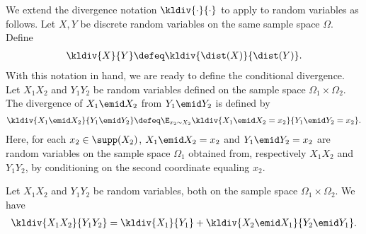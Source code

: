 We extend the divergence notation
$\kldiv{\cdot}{\cdot}$ to apply to random
variables as follows. Let $X,Y$ be discrete random
variables on the same sample space $\Omega$. Define
\begin{align}
\label{eq:klrv}
\kldiv{X}{Y}\defeq \kldiv{\dist(X)}{\dist(Y)}.
\end{align}
%
With this notation in hand, we are ready to define the 
conditional divergence. Let $X_1X_2$ and $Y_1Y_2$ be 
random variables defined on the sample space $\Omega_1\times \Omega_2$.
The divergence of $X_1\emid X_2$ from $Y_1\emid Y_2$ is
defined by 
\begin{align}
\kldiv{X_1\emid X_2}{Y_1\emid Y_2}
    \defeq \E_{x_2\sim X_2}
        \kldiv{X_1\emid X_2=x_2}{Y_1\emid Y_2 = x_2}.
\end{align}
Here, for each $x_2\in\supp(X_2)$, 
$X_1\emid X_2=x_2$ and $Y_1\emid Y_2 = x_2$ 
are random variables on the sample space
$\Omega_1$ obtained from, respectively
$X_1X_2$ and $Y_1Y_2$, by conditioning on the
second coordinate equaling $x_2$.

\begin{lemma}
\label{lem:klchain}
Let $X_1X_2$ and $Y_1Y_2$ be random variables, both on the
sample space $\Omega_1\times \Omega_2$. We have
\begin{align*}
\kldiv{X_1X_2}{Y_1Y_2} = 
    \kldiv{X_1}{Y_1} + \kldiv{X_2\emid X_1}{Y_2\emid Y_1}.
\end{align*}
\end{lemma}
\iffalse
\begin{proof}
Let $\mu,\nu\colon\Omega_1\times \Omega_2\to \realspos$
be the distributions of respectively $X_1X_2$ and $Y_1Y_2$.
Using the shorthands
$\mu(\Omega_1,x_2)\defeq\sum_{x_1\in\Omega_1}\mu(x_1,x_2)$
and 
$\nu(\Omega_1,x_2)\defeq\sum_{x_1\in\Omega_1}\nu(x_1,x_2)$,
we write
\begin{align*}
  \kldiv{X_1\emid X_2}{Y_1\emid Y_2} &=
     \sum_{x_2\in\Omega_2}\mu(\Omega_1,x_2)
       \sum_{x_1\in\Omega_1}\frac{\mu(x_1,x_2)}
           {\mu(\Omega_1,x_2)}
       \log\frac{\mu(x_1,x_2)\nu(\Omega_1,x_2)}
                {\nu(x_1,x_2)\mu(\Omega_1,x_2)}\\
  &= \sum_{x_1,x_2}\mu(x_1,x_2)
       \log\frac{\mu(x_1,x_2)}{\nu(x_1,x_2)} +
     \sum_{x_2}
       \mu(\Omega_1,x_2)\log\frac{\nu(\Omega_1,x_2)}
           {\mu(\Omega_1,x_2)}\\
\intertext{by splitting the terms inside the logarithm. 
Using \autoref{eq:kldiv} together with \autoref{eq:klrv}
 we conclude}
  &= \kldiv{X_1X_2}{Y_1Y_2} - \kldiv{X_2}{Y_2}.
\end{align*}
Rearranging, we obtain the statement of the lemma.
\end{proof}
\fi
